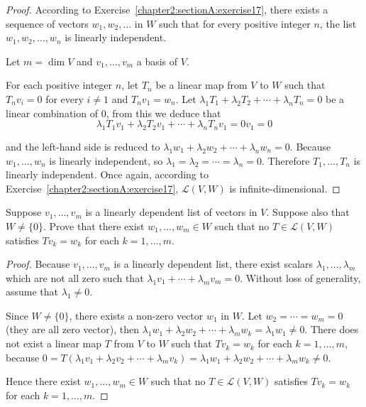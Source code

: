 \begin{proof}
    According to Exercise~\ref{chapter2:sectionA:exercise17}, there exists a sequence of vectors $w_{1}, w_{2}, \ldots$ in $W$ such that for every positive integer $n$, the list $w_{1}, w_{2}, \ldots, w_{n}$ is linearly independent.

    Let $m = \dim V$ and $v_{1}, \ldots, v_{m}$ a basis of $V$.

    For each positive integer $n$, let $T_{n}$ be a linear map from $V$ to $W$ such that $T_{n}v_{i} = 0$ for every $i\ne 1$ and $T_{n}v_{1} = w_{n}$. Let $\lambda_{1}T_{1} + \lambda_{2}T_{2} + \cdots + \lambda_{n}T_{n} = 0$ be a linear combination of $0$, from this we deduce that
    \[ \lambda_{1}T_{1}v_{1} + \lambda_{2}T_{2}v_{1} + \cdots + \lambda_{n}T_{n}v_{1} = 0v_{1} = 0 \]

    and the left-hand side is reduced to $\lambda_{1}w_{1} + \lambda_{2}w_{2} + \cdots + \lambda_{n}w_{n} = 0$. Because $w_{1}, \ldots, w_{n}$ is linearly independent, so $\lambda_{1} = \lambda_{2} = \cdots = \lambda_{n} = 0$. Therefore $T_{1}, \ldots, T_{n}$ is linearly independent. Once again, according to Exercise~\ref{chapter2:sectionA:exercise17}, $\mathcal{L}(V, W)$ is infinite-dimensional.
\end{proof}
\newpage

\begin{exercise}
    Suppose $v_{1} , \ldots, v_{m}$ is a linearly dependent list of vectors in $V$. Suppose also that $W \ne \{0\}$. Prove that there exist $w_{1} , \ldots, w_{m} \in W$ such that no $T \in \mathcal{L}(V, W)$ satisfies $Tv_{k} = w_{k}$ for each $k = 1, \ldots, m$.
\end{exercise}

\begin{proof}
    Because $v_{1} , \ldots, v_{m}$ is a linearly dependent list, there exist scalars $\lambda_{1}, \ldots, \lambda_{m}$ which are not all zero such that $\lambda_{1}v_{1} + \cdots + \lambda_{m}v_{m} = 0$. Without loss of generality, assume that $\lambda_{1}\ne 0$.

    Since $W\ne \{0\}$, there exists a non-zero vector $w_{1}$ in $W$. Let $w_{2} = \cdots = w_{m} = 0$ (they are all zero vector), then $\lambda_{1}w_{1} + \lambda_{2}w_{2} + \cdots + \lambda_{m}w_{k} = \lambda_{1}w_{1}\ne 0$. There does not exist a linear map $T$ from $V$ to $W$ such that $Tv_{k} = w_{k}$ for each $k = 1,\ldots, m$, because $0 = T(\lambda_{1}v_{1} + \lambda_{2}v_{2} + \cdots + \lambda_{m}v_{k}) = \lambda_{1}w_{1} + \lambda_{2}w_{2} + \cdots + \lambda_{m}w_{k} \ne 0$.

    Hence there exist $w_{1}, \ldots, w_{m}\in W$ such that no $T\in\mathcal{L}(V, W)$ satisfies $Tv_{k} = w_{k}$ for each $k = 1, \ldots, m$.
\end{proof}
\newpage

